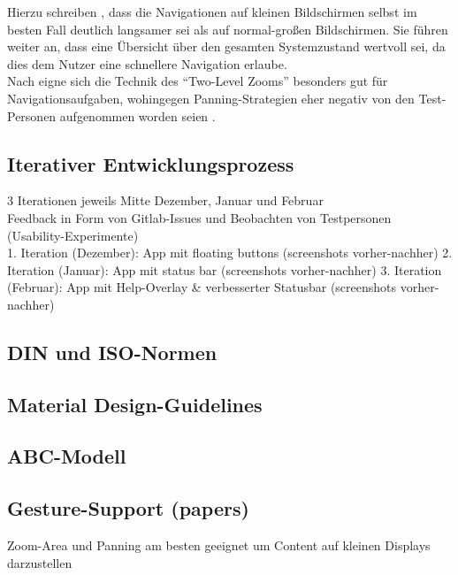 Hierzu schreiben \citeauthor{Gutwin04}, dass die Navigationen auf kleinen Bildschirmen selbst im besten Fall deutlich langsamer sei als auf normal-großen Bildschirmen.
Sie führen weiter an, dass eine Übersicht über den gesamten Systemzustand wertvoll sei, da dies dem Nutzer eine schnellere Navigation erlaube. \\
Nach \citeauthor{Gutwin04} eigne sich die Technik des ``Two-Level Zooms'' besonders gut für Navigationsaufgaben, wohingegen Panning-Strategien eher negativ von den Test-Personen aufgenommen worden seien \citep[Seite 8]{Gutwin04}.  


\subsection{Iterativer Entwicklungsprozess}
  3 Iterationen jeweils Mitte Dezember, Januar und Februar \\
  Feedback in Form von Gitlab-Issues und Beobachten von Testpersonen (Usability-Experimente) \\
  1. Iteration (Dezember): App mit floating buttons (screenshots vorher-nachher)
  2. Iteration (Januar): App mit status bar (screenshots vorher-nachher)
  3. Iteration (Februar): App mit Help-Overlay \& verbesserter Statusbar (screenshots vorher-nachher)
\subsection{DIN und ISO-Normen}
\subsection{Material Design-Guidelines}
\subsection{ABC-Modell}
\subsection{Gesture-Support (papers)}
  Zoom-Area und Panning am besten geeignet um Content auf kleinen Displays darzustellen \\
  
